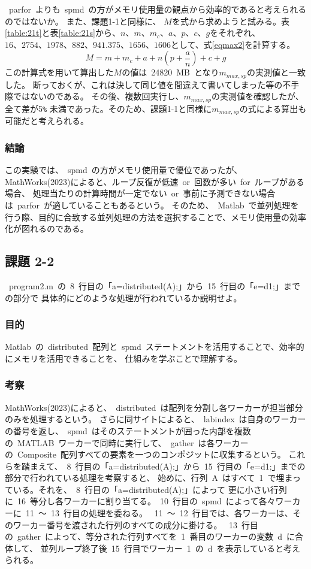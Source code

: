 \documentclass[10pt]{jarticle}
\begin{document}
\ parfor\ よりも\ spmd\ の方がメモリ使用量の観点から効率的であると考えられるのではないか。 また、課題1-1と同様に、
$M$を式から求めようと試みる。表\ref{table:21t}と表\ref{table:21s}から、$n、m、m_{c}、a、p、c、g $をそれぞれ、
$16、2754、1978、882、941.375、1656、1606 $として、式\ref{eqmax2}を計算する。
\begin{equation}
M = m + m_{c}+ a + n(p + \frac{a}{n}) + c + g \label{eqmax2}
\end{equation}
この計算式を用いて算出した$M$の値は\ 24820\ MB\ となり$m_{max,sp}$の実測値と一致した。
断っておくが、これは決して同じ値を間違えて書いてしまった等の不手際ではないのである。
その後、複数回実行し、$m_{max,sp}$の実測値を確認したが、全て差が5\verb|%|
未満であった。そのため、課題1-1と同様に$m_{max,sp}$の式による算出も可能だと考えられる。
%

\subsubsection{結論}
%
この実験では、\ spmd\ の方がメモリ使用量で優位であったが、MathWorks(2023)によると、ループ反復が低速\ or\ 回数が多い\ for\ ループがある場合、
処理当たりの計算時間が一定でない\ or\ 事前に予測できない場合は\ parfor\ が適していることもあるという\cite{mathlab1}。
そのため、\ Matlab\ で並列処理を行う際、目的に合致する並列処理の方法を選択することで、メモリ使用量の効率化が図れるのである。
%

\subsection{課題 2-2}
\ program2.m\ の\ 8\ 行目の「a=distributed(A);」から\ 15\ 行目の「e=d{1};」までの部分で
具体的にどのような処理が行われているか説明せよ。
\subsubsection{目的}
%
Matlab\ の\ distributed\ 配列と\ spmd\ ステートメントを活用することで、効率的にメモリを活用できることを、
仕組みを学ぶことで理解する。
%

\subsubsection{考察}
%
MathWorks(2023)によると、\ distributed\ は配列を分割し各ワーカーが担当部分のみを処理するという\cite{mathlab2}。
さらに同サイトによると、\ labindex\ は自身のワーカーの番号を返し\cite{mathlab3}、\ spmd\ はそのステートメントが囲った内部を複数の\ MATLAB\ 
ワーカーで同時に実行して\cite{mathlab4}、\ gather\ は各ワーカーの\ Composite\ 配列すべての要素を一つのコンポジットに収集するという\cite{mathlab5}。
これらを踏まえて、\ 8\ 行目の「a=distributed(A);」から\ 15\ 行目の「e=d{1};」までの部分で行われている処理を考察すると、
始めに、行列\ A\ はすべて\ 1\ で埋まっている。それを、\ 8\ 行目の「a=distributed(A);」によって
更に小さい行列に\ 16\ 等分し各ワーカーに割り当てる。\ 10\ 行目の\ spmd\ によって各々ワーカーに\ 11\ ～\ 13\ 行目の処理を委ねる。
\ 11\ ～\ 12\ 行目では、各ワーカーは、そのワーカー番号を渡された行列のすべての成分に掛ける。
\ 13\ 行目の\ gather\ によって、等分された行列すべてを\ 1\ 番目のワーカーの変数\ d\ に合体して、
並列ループ終了後\ 15\ 行目でワーカー\ 1\ の\ d\ を表示していると考えられる。
%
\end{document}
